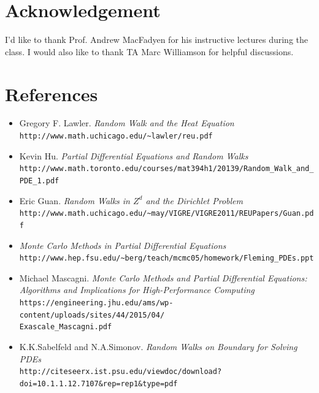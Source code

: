 \documentclass[aps, prl, preprint, groupedaddress]{revtex4-1}
\begin{document}
\section{Acknowledgement}

I'd like to thank Prof. Andrew MacFadyen for his instructive lectures during the class. I would also like to thank TA Marc Williamson for helpful discussions.

\section{References}

\begin{itemize}

    \item Gregory F. Lawler.
    \textit{Random Walk and the Heat Equation}
    \\\texttt{http://www.math.uchicago.edu/\~{}lawler/reu.pdf}

    \item Kevin Hu.
    \textit{Partial Differential Equations and Random Walks}
    \\\texttt{http://www.math.toronto.edu/courses/mat394h1/20139/Random\_Walk\_and\_PDE\_1.pdf}

    \item Eric Guan.
    \textit{Random Walks in $Z^d$ and the Dirichlet Problem}
    \\\texttt{http://www.math.uchicago.edu/\~{}may/VIGRE/VIGRE2011/REUPapers/Guan.pdf}

    \item
    \textit{Monte Carlo Methods in Partial Differential Equations}
    \\\texttt{http://www.hep.fsu.edu/\~{}berg/teach/mcmc05/homework/Fleming\_PDEs.ppt}

    \item Michael Mascagni.
    \textit{Monte Carlo Methods and Partial Differential Equations: Algorithms and Implications for High-Performance Computing}
    \\\texttt{https://engineering.jhu.edu/ams/wp-content/uploads/sites/44/2015/04/\\Exascale\_Mascagni.pdf}

    \item K.K.Sabelfeld and N.A.Simonov.
    \textit{Random Walks on Boundary for Solving PDEs}
    \\\texttt{http://citeseerx.ist.psu.edu/viewdoc/download?doi=10.1.1.12.7107\&rep=rep1\&type=pdf}
\end{itemize}
\end{document}

